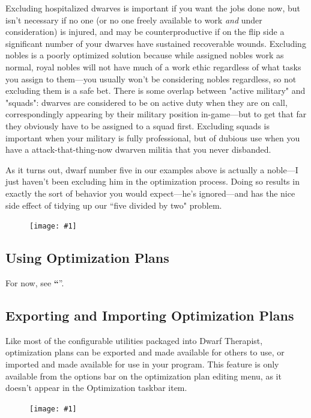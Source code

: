\documentclass[]{article}
\newcommand{\jump}[1] {\textbf{``\nameref{sec:#1}}''}
\newcommand{\fullfigure}[1] {
\begin{figure}[h!]
\texttt{[image: \#1]}
\end{figure}
}
\begin{document}
Excluding hospitalized dwarves is important if you want the jobs done now, but isn't necessary if no one
(or no one freely available to work \emph{and} under consideration) is injured, and may be
counterproductive if on the flip side a significant number of your dwarves have sustained recoverable
wounds. Excluding nobles is a poorly optimized solution because while assigned nobles work as normal,
royal nobles will not have much of a work ethic regardless of what tasks you assign to them---you usually
won't be considering nobles regardless, so not excluding them is a safe bet. There is some overlap
between "active military" and "squads": dwarves are considered to be on active duty when they are on
call, correspondingly appearing by their military position in-game---but to get that far they obviously
have to be assigned to a squad first. Excluding squads is important when your military is fully
professional, but of dubious use when you have a attack-that-thing-now dwarven militia that you never
disbanded.

As it turns out, dwarf number five in our examples above is actually a noble---I just haven't been
excluding him in the optimization process. Doing so results in exactly the sort of behavior you would
expect---he's ignored---and has the nice side effect of tidying up our ``five divided by two" problem.
\fullfigure{Sec4Fig15}

\subsection{Using Optimization Plans}
\label{Using Optimization Plans}

For now, see \jump{Putting it all Together}.

\subsection{Exporting and Importing Optimization Plans}
\label{sec:Exporting and Importing Optimization Plans}

Like most of the configurable utilities packaged into Dwarf Therapist, optimization plans can be exported
and made available for others to use, or imported and made available for use in your program. This
feature is only available from the options bar on the optimization plan editing menu, as it doesn't
appear in the Optimization taskbar item.%

\fullfigure{Sec4Fig17}
\end{document}
